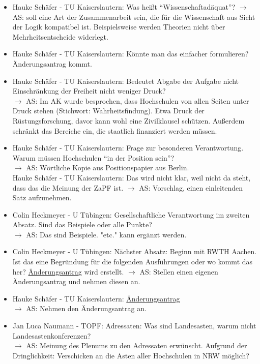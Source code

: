     \begin{itemize}
      \item Hauke Schäfer - TU Kaiserslautern:  Was heißt ``Wissenschaftadäquat''?
        $\rightarrow$ AS: soll eine Art der Zusammenarbeit sein, die für die Wissenschaft aus Sicht der Logik kompatibel ist. Beispielsweise werden Theorien nicht über Mehrheitsentscheide widerlegt.
      \item Hauke Schäfer - TU Kaiserslautern:  Könnte man das einfacher formulieren? Änderungsantrag kommt.
      \item Hauke Schäfer - TU Kaiserslautern:  Bedeutet Abgabe der Aufgabe nicht Einschränkung der Freiheit nicht weniger Druck? \\
        $\rightarrow$ AS: Im AK wurde besprochen, dass Hochschulen von allen Seiten unter Druck stehen (Stichwort: Wahrheitsfindung). Etwa Druck der Rüstungsforschung, davor kann wohl eine Zivilklausel schützen. Außerdem schränkt das Bereiche ein, die staatlich finanziert werden müssen.
      \item Hauke Schäfer - TU Kaiserslautern:  Frage zur besonderen Verantwortung. Warum müssen Hochschulen ``in der Position sein''? \\
        $\rightarrow$ AS: Wörtliche Kopie aus Positionspapier aus Berlin. \\
        Hauke Schäfer - TU Kaiserslautern:  Das wird nicht klar, weil nicht da steht, dass das die Meinung der ZaPF ist.
        $\rightarrow$ AS: Vorschlag, einen einleitenden Satz aufzunehmen.
      \item Colin Heckmeyer - U Tübingen:  Gesellschaftliche Verantwortung im zweiten Absatz. Sind das Beispiele oder alle Punkte? \\
        $\rightarrow$ AS: Das sind Beispiele. "etc." kann ergänzt werden.
      \item Colin Heckmeyer - U Tübingen:  Nächster Absatz: Beginn mit RWTH Aachen. Ist das eine Begründung für die folgenden Ausführungen oder wo kommt das her? \underline{Änderungsantrag} wird erstellt.
        $\rightarrow$ AS: Stellen einen eigenen Änderungsantrag und nehmen diesen an.
      \item Hauke Schäfer - TU Kaiserslautern:  \underline{Änderungsantrag} \\
        $\rightarrow$ AS: Nehmen den Änderungsantrag an.
      \item Jan Luca Naumann - TOPF:  Adressaten: Was sind Landesasten, warum nicht Landesastenkonferenzen? \\
        $\rightarrow$ AS: Meinung des Plenums zu den Adressaten erwünscht. Aufgrund der Dringlichkeit: Verschicken an die Asten aller Hochschulen in NRW möglich? \\

\end{itemize}
